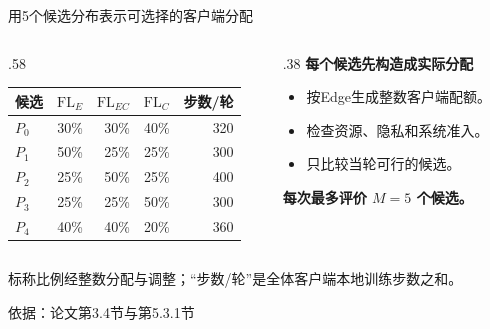 \documentclass[aspectratio=169,11pt]{beamer}
\newcommand{\FlE}{\mathrm{FL}_{E}}
\newcommand{\FlEC}{\mathrm{FL}_{EC}}
\newcommand{\FlC}{\mathrm{FL}_{C}}
\newcommand{\key}[1]{{\color{Teal}\bfseries #1}}
\newcommand{\src}[1]{\vfill{\color{Gray}\fontsize{7.5}{9}\selectfont 依据：#1\par}}
\newcommand{\tight}{\setlength{\itemsep}{.18cm}}
\begin{document}
\begin{frame}{用5个候选分布表示可选择的客户端分配}
\begin{columns}[T,onlytextwidth]
\begin{column}{.58\textwidth}
\renewcommand{\arraystretch}{1.45}
\centering
\begin{tabular}{lrrrr}
\toprule
候选 & $\FlE$ & $\FlEC$ & $\FlC$ & 步数/轮\\
\midrule
$P_0$ &30\%&30\%&40\%&320\\
$P_1$ &50\%&25\%&25\%&300\\
\rowcolor{Pale}
$P_2$ &25\%&50\%&25\%&400\\
$P_3$ &25\%&25\%&50\%&300\\
$P_4$ &40\%&40\%&20\%&360\\
\bottomrule
\end{tabular}\par
\end{column}
\begin{column}{.38\textwidth}
\textbf{每个候选先构造成实际分配}
\begin{itemize}\tight
\item 按Edge生成整数客户端配额。
\item 检查资源、隐私和系统准入。
\item 只比较当轮可行的候选。
\end{itemize}
\par\vspace{.2cm}
\key{每次最多评价 $M=5$ 个候选。}
\end{column}
\end{columns}
\par\vspace{.25cm}
标称比例经整数分配与调整；“步数/轮”是全体客户端本地训练步数之和。
\src{论文第3.4节与第5.3.1节}
\end{frame}
\end{document}
